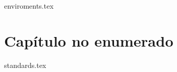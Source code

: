 \documentclass[11pt, oneside]{book}
\begin{document}
	\getcover
	\frontmatter
		\getcoverpage
		\tableofcontents
	\mainmatter
	{enviroments.tex}\cleanalldata
	\chapter*{Capítulo no enumerado}
	\appendix
		{standards.tex}\cleanalldata
\end{document}

